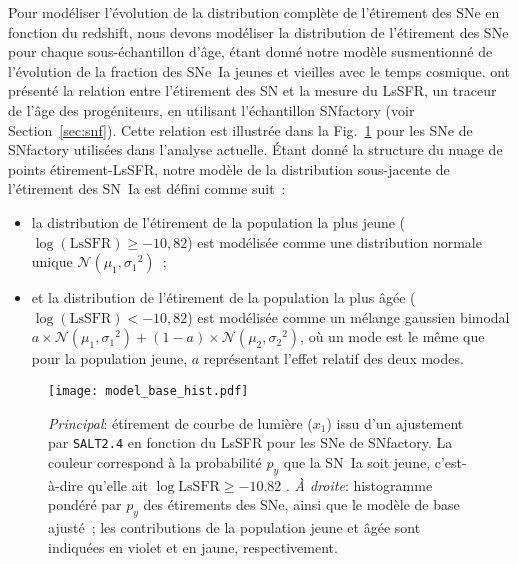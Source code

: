 \documentclass[../main/main.tex]{subfiles}
\begin{document}
Pour modéliser l'évolution de la distribution complète de l'étirement des SNe en
fonction du redshift, nous devons modéliser la distribution de l'étirement des
SNe pour chaque sous-échantillon d'âge, étant donné notre modèle susmentionné de
l'évolution de la fraction des SNe~Ia jeunes et vieilles avec le temps cosmique.
\cite{rigault2020} ont présenté la relation entre l'étirement des SN et la
mesure du LsSFR, un traceur de l'âge des progéniteurs, en utilisant
l'échantillon SNfactory (voir Section~\ref{sec:snf}). Cette relation est
illustrée dans la Fig.~\ref{fig:stretchlssfr} pour les SNe de SNfactory
utilisées dans l'analyse actuelle. Étant donné la structure du nuage de points
étirement-LsSFR, notre modèle de la distribution sous-jacente de l'étirement des
SN~Ia est défini comme suit~:
\begin{itemize}
    \item la distribution de l'étirement de la population la plus jeune
        ($\log(\mathrm{LsSFR})\geq-10,82$) est modélisée comme une distribution
        normale unique $\mathcal{N}(\mu_1, \sigma_1{}^2)$~;
    \item et la distribution de l'étirement de la population la plus âgée
        ($\log(\mathrm{LsSFR})<-10,82$) est modélisée comme un mélange gaussien
        bimodal $a\times \mathcal{N} (\mu_1, \sigma_1{}^2) + (1-a)\times
        \mathcal{N}(\mu_2, \sigma_2{}^2)$, où un mode est le même que pour la
        population jeune, $a$ représentant l'effet relatif des deux modes.
\end{itemize}

\begin{figure}
    \centering
    \texttt{[image: model\_base\_hist.pdf]}
    \caption[Étirement en fonction du LsSFR des SNe~Ia de SNfactory et modèles
    d'étirement de base ajustés]{\textit{Principal}: étirement de courbe de
        lumière ($x_1$) issu d'un ajustement par \textsc{\texttt{SALT2.4}} en
        fonction du LsSFR pour les SNe de SNfactory. La couleur correspond à la
        probabilité $p_y$ que la SN~Ia soit jeune, c'est-à-dire qu'elle ait
        $\log\mathrm{LsSFR} \geq -10.82$ \citep[voir][]{rigault2020}. \textit{À
        droite}: histogramme pondéré par $p_y$ des étirements des SNe, ainsi que
        le modèle de base ajusté~; les contributions de la population jeune
    et âgée sont indiquées en violet et en jaune, respectivement.}
    \label{fig:stretchlssfr}
\end{figure}
\end{document}
